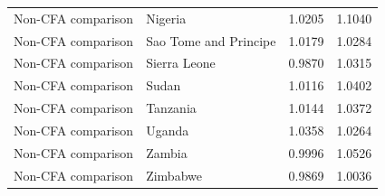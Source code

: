 \begin{table}
\begin{tabular}[t]{llrr}
Non-CFA comparison & Nigeria & 1.0205 & 1.1040\\
Non-CFA comparison & Sao Tome and Principe & 1.0179 & 1.0284\\
Non-CFA comparison & Sierra Leone & 0.9870 & 1.0315\\
\addlinespace
Non-CFA comparison & Sudan & 1.0116 & 1.0402\\
Non-CFA comparison & Tanzania & 1.0144 & 1.0372\\
Non-CFA comparison & Uganda & 1.0358 & 1.0264\\
Non-CFA comparison & Zambia & 0.9996 & 1.0526\\
Non-CFA comparison & Zimbabwe & 0.9869 & 1.0036\\
\bottomrule
\end{tabular}
\end{table}